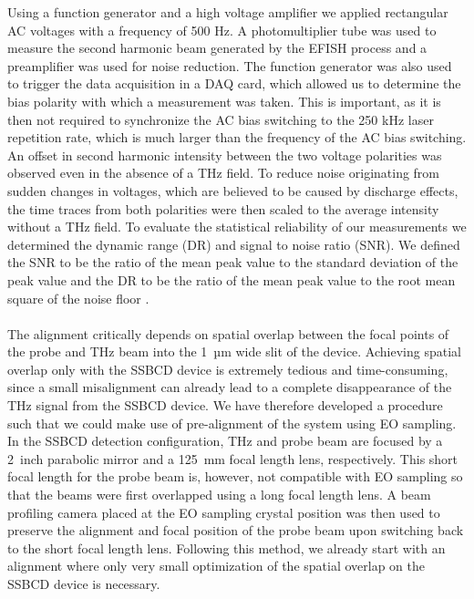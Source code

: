 \documentclass{article}
\begin{document}
Using a function generator and a high voltage amplifier we applied rectangular AC voltages with a frequency of 500 Hz. A photomultiplier tube was used to measure the second harmonic beam generated by the EFISH process and a preamplifier was used for noise reduction. The function generator was also used to trigger the data acquisition in a DAQ card, which allowed us to determine the bias polarity with which a measurement was taken. This is important, as it is then not required to synchronize the AC bias switching to the 250 kHz laser repetition rate, which is much larger than the frequency of the AC bias switching. An offset in second harmonic intensity between the two voltage polarities was observed even in the absence of a THz field. To reduce noise originating from sudden changes in voltages, which are believed to be caused by discharge effects, the time traces from both polarities were then scaled to the average intensity without a THz field. To evaluate the statistical reliability of our measurements we determined the dynamic range (DR) and signal to noise ratio (SNR). We defined the SNR to be the ratio of the mean peak value to the standard deviation of the peak value and the DR to be the ratio of the mean peak value to the root mean square of the noise floor \cite{naftaly-2009}.
\\~\\
The alignment critically depends on spatial overlap between the focal points of the probe and THz beam into the \mbox{1 µm} wide slit of the device. Achieving spatial overlap only with the SSBCD device is extremely tedious and time-consuming, since a small misalignment can already lead to a complete disappearance of the THz signal from the SSBCD device. We have therefore developed a procedure such that we could make use of pre-alignment of the system using EO sampling. In the SSBCD detection configuration, THz and probe beam are focused by a \mbox{2 inch} parabolic mirror and a \mbox{125 mm} focal length lens, respectively. This short focal length for the probe beam is, however, not compatible with EO sampling so that the beams were first overlapped using a long focal length lens. A beam profiling camera placed at the EO sampling crystal position was then used to preserve the alignment and focal position of the probe beam upon switching back to the short focal length lens. Following this method, we already start with an alignment where only very small optimization of the spatial overlap on the SSBCD device is necessary.
\end{document}
